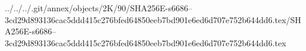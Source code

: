 ../../../.git/annex/objects/2K/90/SHA256E-s6686--3cd29d893136cac5ddd415c276bfed64850eeb7bd901e6ed6d707e752b644dd6.tex/SHA256E-s6686--3cd29d893136cac5ddd415c276bfed64850eeb7bd901e6ed6d707e752b644dd6.tex